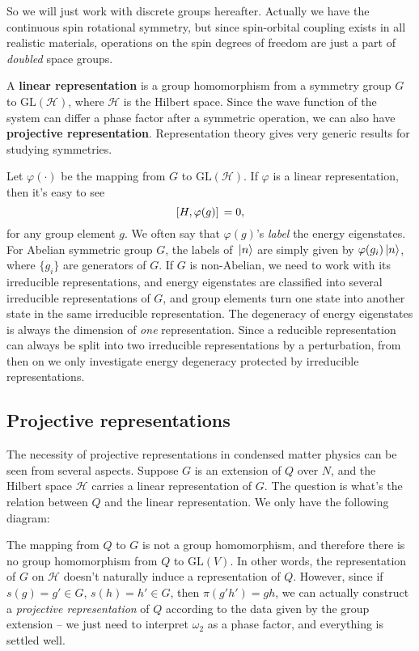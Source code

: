 \documentclass[hyperref, a4paper]{article}
\newcommand*{\concept}[1]{{\textbf{#1}}}
\begin{document}
So we will just work with discrete groups hereafter. Actually we have the continuous spin rotational symmetry,
but since spin-orbital coupling exists in all realistic materials, operations on the spin degrees of freedom 
are just a part of \emph{doubled} space groups.

A \concept{linear representation} is a group homomorphism from a symmetry group $G$ to $\mathrm{GL}(\mathcal{H})$,
where $\mathcal{H}$ is the Hilbert space. Since the wave function of the system can differ a phase factor 
after a symmetric operation, we can also have \concept{projective representation}. 
Representation theory gives very generic results for studying symmetries.

Let $\varphi(\cdot)$ be the mapping from $G$ to $\mathrm{GL}(\mathcal{H})$. If $\varphi$ is a linear representation,
then it's easy to see 
\begin{equation}
    \comm*{H}{\varphi(g)} = 0,
\end{equation}
for any group element $g$. We often say that $\varphi(g)$'s \emph{label} the energy eigenstates. 
For Abelian symmetric group $G$, the labels of $\ket*{n}$ are simply given by $\varphi(g_i) \ket*{n}$, where $\{g_i\}$ 
are generators of $G$. If $G$ is non-Abelian, we need to work with its irreducible representations, and 
energy eigenstates are classified into several irreducible representations of $G$, and group elements turn one 
state into another state in the same irreducible representation. The degeneracy of energy eigenstates is 
always the dimension of \emph{one} representation. Since a reducible representation can always be split into 
two irreducible representations by a perturbation, from then on we only investigate energy degeneracy protected 
by irreducible representations.


\subsection{Projective representations}

The necessity of projective representations in condensed matter physics can be seen from several aspects.
Suppose $G$ is an extension of $Q$ over $N$, and the Hilbert space $\mathcal{H}$ carries a linear representation of $G$.
The question is what's the relation between $Q$ and the linear representation. 
We only have the following diagram:

The mapping from $Q$ to $G$ is not a group homomorphism, and therefore there is no group homomorphism from 
$Q$ to $\mathrm{GL}(V)$. In other words, the representation of $G$ on $\mathcal{H}$ doesn't naturally induce 
a representation of $Q$. However, since if $s(g) = g' \in G$, $s(h) = h' \in G$, then $\pi(g' h') = gh$, 
we can actually construct a \emph{projective representation} of $Q$ according to the data given by the group 
extension -- we just need to interpret $\omega_2$ as a phase factor, and everything is settled well. 
\end{document}
